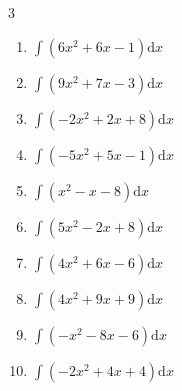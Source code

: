 \begin{multicols}{3}
\begin{enumerate}

\columnbreak %

  \item $\displaystyle \int \left( 6x^{2}+6x-1 \right) \mathrm{d}x$


  \item $\displaystyle \int \left( 9x^{2}+7x-3 \right) \mathrm{d}x$


  \item $\displaystyle \int \left( -2x^{2}+2x+8 \right) \mathrm{d}x$


  \item $\displaystyle \int \left( -5x^{2}+5x-1 \right) \mathrm{d}x$


  \item $\displaystyle \int \left( x^{2}-x-8 \right) \mathrm{d}x$


  \item $\displaystyle \int \left( 5x^{2}-2x+8 \right) \mathrm{d}x$


  \item $\displaystyle \int \left( 4x^{2}+6x-6 \right) \mathrm{d}x$


  \item $\displaystyle \int \left( 4x^{2}+9x+9 \right) \mathrm{d}x$


  \item $\displaystyle \int \left( -x^{2}-8x-6 \right) \mathrm{d}x$


  \item $\displaystyle \int \left( -2x^{2}+4x+4 \right) \mathrm{d}x$


\end{enumerate}
\end{multicols}
